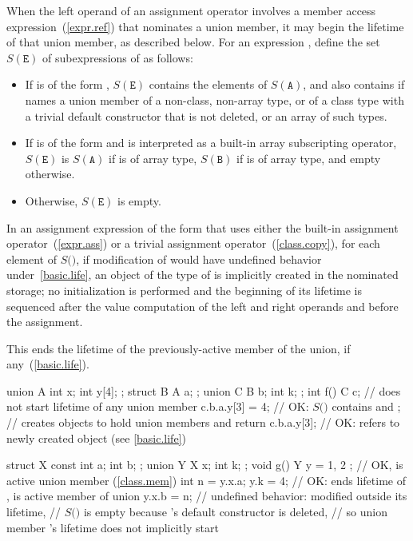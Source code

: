 \pnum
When the left operand of an assignment operator
involves a member access expression~(\ref{expr.ref})
that nominates a union member,
it may begin the lifetime of that union member,
as described below.
For an expression ,
define the set $S(\mathtt{E})$
of subexpressions of 
as follows:
\begin{itemize}
\item
If  is of the form ,
$S(\mathtt{E})$ contains the elements of $S(\mathtt{A})$,
and also contains 
if  names a union member of a non-class, non-array type,
or of a class type with a trivial default constructor that is not deleted,
or an array of such types.
\item
If  is of the form 
and is interpreted as a built-in array subscripting operator,
$S(\mathtt{E})$ is $S(\mathtt{A})$ if  is of array type,
$S(\mathtt{B})$ if  is of array type,
and empty otherwise.
\item
Otherwise, $S(\mathtt{E})$ is empty.
\end{itemize}
In an assignment expression of the form 
that uses either the built-in assignment operator~(\ref{expr.ass})
or a trivial assignment operator~(\ref{class.copy}),
for each element  of $S($$)$,
if modification of  would have undefined behavior under~\ref{basic.life},
an object of the type of  is implicitly created
in the nominated storage;
no initialization is performed and
the beginning of its lifetime is sequenced after
the value computation of the left and right operands
and before the assignment.
\begin{note}
This ends the lifetime of the previously-active
member of the union, if any~(\ref{basic.life}).
\end{note}
\begin{example}
\begin{codeblock}
union A { int x; int y[4]; };
struct B { A a; };
union C { B b; int k; };
int f() {
  C c;                  // does not start lifetime of any union member
  c.b.a.y[3] = 4;       // OK: $S($$)$ contains  and ;
                        // creates objects to hold union members  and 
  return c.b.a.y[3];    // OK:  refers to newly created object (see \ref{basic.life})
}

struct X { const int a; int b; };
union Y { X x; int k; };
void g() {
  Y y = { { 1, 2 } };   // OK,  is active union member (\ref{class.mem})
  int n = y.x.a;
  y.k = 4;              // OK: ends lifetime of ,  is active member of union
  y.x.b = n;            // undefined behavior:  modified outside its lifetime,
                        // $S($$)$ is empty because 's default constructor is deleted,
                        // so union member 's lifetime does not implicitly start
}
\end{codeblock}
\end{example}

